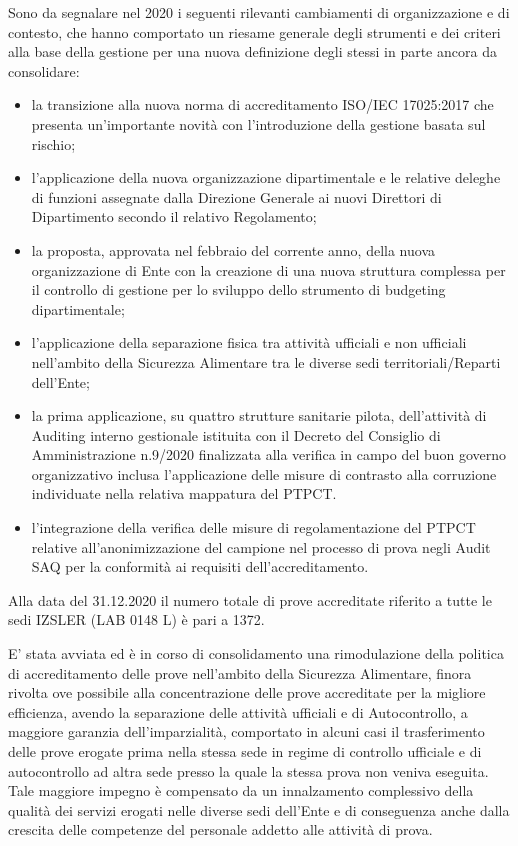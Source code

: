 \documentclass[
  12pt,
]{article}
\providecommand{\tightlist}{%
  \setlength{\itemsep}{0pt}\setlength{\parskip}{0pt}}
\begin{document}
Sono da segnalare nel 2020 i seguenti rilevanti cambiamenti di
organizzazione e di contesto, che hanno comportato un riesame generale
degli strumenti e dei criteri alla base della gestione per una nuova
definizione degli stessi in parte ancora da consolidare:

\begin{itemize}
\tightlist
\item
  la transizione alla nuova norma di accreditamento ISO/IEC 17025:2017
  che presenta un'importante novità con l'introduzione della gestione
  basata sul rischio;
\item
  l'applicazione della nuova organizzazione dipartimentale e le relative
  deleghe di funzioni assegnate dalla Direzione Generale ai nuovi
  Direttori di Dipartimento secondo il relativo Regolamento;
\item
  la proposta, approvata nel febbraio del corrente anno, della nuova
  organizzazione di Ente con la creazione di una nuova struttura
  complessa per il controllo di gestione per lo sviluppo dello strumento
  di budgeting dipartimentale;
\item
  l'applicazione della separazione fisica tra attività ufficiali e non
  ufficiali nell'ambito della Sicurezza Alimentare tra le diverse sedi
  territoriali/Reparti dell'Ente;
\item
  la prima applicazione, su quattro strutture sanitarie pilota,
  dell'attività di Auditing interno gestionale istituita con il Decreto
  del Consiglio di Amministrazione n.9/2020 finalizzata alla verifica in
  campo del buon governo organizzativo inclusa l'applicazione delle
  misure di contrasto alla corruzione individuate nella relativa
  mappatura del PTPCT.\\
\item
  l'integrazione della verifica delle misure di regolamentazione del
  PTPCT relative all'anonimizzazione del campione nel processo di prova
  negli Audit SAQ per la conformità ai requisiti dell'accreditamento.
\end{itemize}

Alla data del 31.12.2020 il numero totale di prove accreditate riferito
a tutte le sedi IZSLER (LAB 0148 L) è pari a 1372.

E' stata avviata ed è in corso di consolidamento una rimodulazione della
politica di accreditamento delle prove nell'ambito della Sicurezza
Alimentare, finora rivolta ove possibile alla concentrazione delle prove
accreditate per la migliore efficienza, avendo la separazione delle
attività ufficiali e di Autocontrollo, a maggiore garanzia
dell'imparzialità, comportato in alcuni casi il trasferimento delle
prove erogate prima nella stessa sede in regime di controllo ufficiale e
di autocontrollo ad altra sede presso la quale la stessa prova non
veniva eseguita. Tale maggiore impegno è compensato da un innalzamento
complessivo della qualità dei servizi erogati nelle diverse sedi
dell'Ente e di conseguenza anche dalla crescita delle competenze del
personale addetto alle attività di prova.
\end{document}
